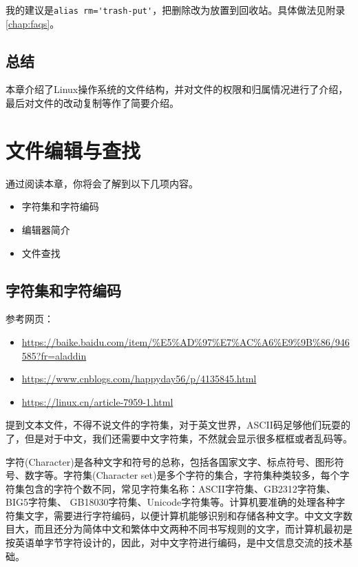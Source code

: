 \documentclass[doctor,openright,twoside]{sjtuthesis}
\providecommand{\tightlist}{%
    \setlength{\itemsep}{0pt}\setlength{\parskip}{0pt}}
\newcommand{\passthrough}[1]{#1}
\theoremstyle{plain}
\theoremstyle{definition}
\theoremstyle{remark}
\theoremstyle{ocrenumbox}
\theoremstyle{plain}
\begin{document}
我的建议是\passthrough{\lstinline!alias rm='trash-put'!}，把删除改为放置到回收站。具体做法见附录\ref{chap:faqs}。

\hypertarget{section-74}{%
\section{总结}\label{section-74}}

本章介绍了Linux操作系统的文件结构，并对文件的权限和归属情况进行了介绍，最后对文件的改动复制等作了简要介绍。

\hypertarget{chap:vim-find}{%
\chapter{文件编辑与查找}\label{chap:vim-find}}

通过阅读本章，你将会了解到以下几项内容。

\begin{itemize}
\tightlist
\item
  字符集和字符编码
\item
  编辑器简介
\item
  文件查找
\end{itemize}

\hypertarget{section-75}{%
\section{字符集和字符编码}\label{section-75}}

参考网页：

\begin{itemize}
\tightlist
\item
  \url{https://baike.baidu.com/item/\%E5\%AD\%97\%E7\%AC\%A6\%E9\%9B\%86/946585?fr=aladdin}
\item
  \url{https://www.cnblogs.com/happyday56/p/4135845.html}
\item
  \url{https://linux.cn/article-7959-1.html}
\end{itemize}

提到文本文件，不得不说文件的字符集，对于英文世界，ASCII码足够他们玩耍的了，但是对于中文，我们还需要中文字符集，不然就会显示很多框框或者乱码等。

字符(Character)是各种文字和符号的总称，包括各国家文字、标点符号、图形符号、数字等。字符集(Character set)是多个字符的集合，字符集种类较多，每个字符集包含的字符个数不同，常见字符集名称：ASCII字符集、GB2312字符集、BIG5字符集、 GB18030字符集、Unicode字符集等。计算机要准确的处理各种字符集文字，需要进行字符编码，以便计算机能够识别和存储各种文字。中文文字数目大，而且还分为简体中文和繁体中文两种不同书写规则的文字，而计算机最初是按英语单字节字符设计的，因此，对中文字符进行编码，是中文信息交流的技术基础。
\end{document}
